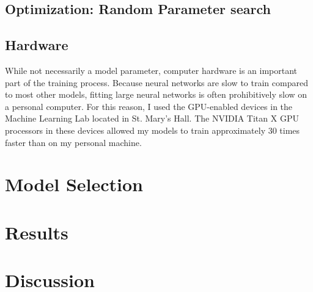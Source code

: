 \documentclass[12pt]{article}  %
\theoremstyle{definition}
\theoremstyle{remark}
\begin{document}
\subsection{Optimization: Random Parameter search}

\subsection{Hardware}
\par While not necessarily a model parameter, computer hardware is an important part of the training process. Because neural networks are slow to train compared to most other models, fitting large neural networks is often prohibitively slow on a personal computer. For this reason, I used the GPU-enabled devices in the Machine Learning Lab located in St. Mary's Hall. The NVIDIA Titan X GPU processors in these devices allowed my models to train approximately 30 times faster than on my personal machine. 

\section{Model Selection}

\section{Results}

\section{Discussion}




\end{document}
